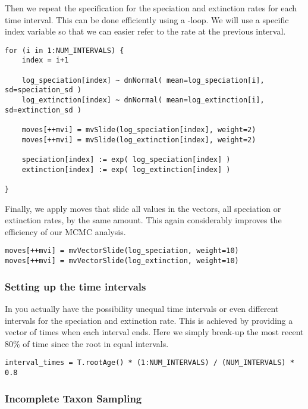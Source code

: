 Then we repeat the specification for the speciation and extinction rates for each time interval.
This can be done efficiently using a -loop.
We will use a specific index variable so that we can easier refer to the rate at the previous interval.
{\tt \begin{snugshade*}
\begin{lstlisting}
for (i in 1:NUM_INTERVALS) {
    index = i+1
    
    log_speciation[index] ~ dnNormal( mean=log_speciation[i], sd=speciation_sd )
    log_extinction[index] ~ dnNormal( mean=log_extinction[i], sd=extinction_sd )

    moves[++mvi] = mvSlide(log_speciation[index], weight=2)
    moves[++mvi] = mvSlide(log_extinction[index], weight=2)

    speciation[index] := exp( log_speciation[index] )
    extinction[index] := exp( log_extinction[index] )

}
\end{lstlisting}
\end{snugshade*}}
Finally, we apply moves that slide all values in the vectors, \IE all speciation or extinction rates, by the same amount. 
This again considerably improves the efficiency of our MCMC analysis.
{\tt \begin{snugshade*}
\begin{lstlisting}
moves[++mvi] = mvVectorSlide(log_speciation, weight=10)
moves[++mvi] = mvVectorSlide(log_extinction, weight=10)
\end{lstlisting}
\end{snugshade*}}


\subsubsection{Setting up the time intervals}
In \RevBayes you actually have the possibility unequal time intervals or even different intervals for the speciation and extinction rate.
This is achieved by providing a vector of times when each interval ends.
Here we simply break-up the most recent 80\% of time since the root in equal intervals.
{\tt \begin{snugshade*}
\begin{lstlisting}
interval_times = T.rootAge() * (1:NUM_INTERVALS) / (NUM_INTERVALS) * 0.8
\end{lstlisting}
\end{snugshade*}}


\subsubsection{Incomplete Taxon Sampling}

